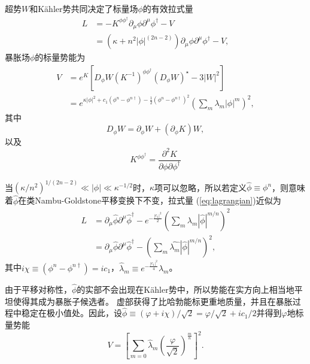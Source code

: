 超势$W$和K\"ahler势共同决定了标量场$\phi$的有效拉式量
\begin{equation}
\begin{split}\label{eq:lagrangian}
L &= -K^{\phi\phi^\dagger} \partial_\mu\phi\partial^\mu\phi^\dagger
- V \\
  & = (\kappa + n^2|\phi|^{(2n-2)})
  \partial_\mu \phi \partial^\mu \phi^\dagger - V,
\end{split}
\end{equation}
暴胀场$\phi$的标量势能为
\begin{equation}
\begin{split}
V &= e^K \left[
    D_\phi W{(K^{-1})}^{\phi\phi^\dagger}{(D_\phi W)}^{\star} - 3|W|^2 
    \right]\\
  &=
  e^{\kappa|\phi|^2+c_1(\phi^n-\phi^{n\dagger})-\frac{1}{2}{(\phi^n-\phi^{n\dagger})}^2}{(\sum_m
  \lambda_m|\phi|^m)}^2,
\end{split}
\end{equation}
其中
\begin{equation}
    D_\phi W = \partial_\phi W + (\partial_\phi K) W,
\end{equation}
以及
\begin{equation}
    K^{\phi\phi^\dagger} = \frac{\partial^2 K}{\partial\phi
    \partial\phi^\dagger}
\end{equation}

当${(\kappa/n^2)}^{1/(2n-2)}\ll |\phi| \ll
\kappa^{-1/2}$时，$\kappa$项可以忽略，所以若定义$\hat{\phi} \equiv
\phi^n$，则意味着$\hat{\phi}$在类Nambu-Goldstone平移变换下不变，拉式量
(\ref{eq:lagrangian})近似为
\begin{equation}
\begin{split}
    L &= \partial_\mu \hat{\phi}\partial^\mu \hat{\phi}^\dagger -
    e^{-\frac{|c_1|^2}{2}}{(\sum_m \lambda_m|\hat{\phi}|^{m/n})}^2 \\
    &= \partial_\mu \hat{\phi} \partial^\mu \hat{\phi}^\dagger - 
    {(\sum_m \hat{\lambda_m}|\hat{\phi}|^{m/n})}^2,
\end{split}
\end{equation}
其中$i\chi \equiv (\phi^n - \phi^{n\dagger})=i c_1$，$\hat{\lambda}_m\equiv
e^{-\frac{|c_1|^2}{4}}\lambda_m$。

由于平移对称性，$\hat{\phi}$的实部不会出现在K\"ahler势中，所以势能在实方向上相当地平坦使得其成为暴胀子候选者。
虚部获得了比哈勃能标更重地质量，并且在暴胀过程中稳定在极小值处。因此，设$\hat{\phi}\equiv
(\varphi+i \chi)/\sqrt{2}=\varphi/\sqrt{2}+i
c_1/2$并得到$\varphi$地标量势能
\begin{equation}\label{eq:varphi_scalar_potential}
    V = {\left[\sum_{m=0}\hat{\lambda}_m
    {\left(\frac{\varphi}{\sqrt{2}}\right)}^{\frac{m}{n}}\right]}^2.
\end{equation}


